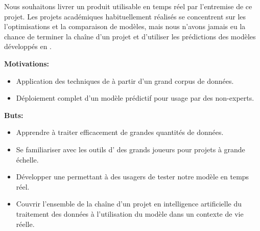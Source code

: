 Nous souhaitons livrer un produit utilisable en temps réel par l'entremise de ce projet. 
Les projets académiques habituellement réalisés se concentrent sur les l'optimisations et la comparaison de modèles, mais nous n'avons jamais eu la chance de terminer la chaîne d'un projet et d'utiliser les prédictions des modèles développés en .

\vspace{5mm}
\textbf{Motivations:}
\begin{itemize}
  \item Application des techniques de  à partir d'un grand corpus de données.
  \item Déploiement complet d'un modèle prédictif pour usage par des non-experts.
\end{itemize}

\vspace{0mm}
\textbf{Buts:}
\begin{itemize}
  \item Apprendre à traiter efficacement de grandes quantités de données.
  \item Se familiariser avec les outils d' des grands joueurs pour projets à grande échelle.
  \item Développer une  permettant à des usagers de tester notre modèle en temps réel.
  \item Couvrir l'ensemble de la chaîne d'un projet en intelligence artificielle du traitement des données à l'utilisation du modèle dans un contexte de vie réelle.
\end{itemize}